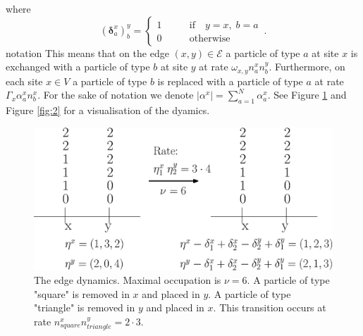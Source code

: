 \documentclass[10pt]{article}
\numberwithin{equation}{section}
\numberwithin{equation}{subsection}
\begin{document}
where 
\begin{equation}
(\bm{\delta}_{a}^{x})^{y}_{b}=\begin{cases}
1\qquad &\text{if}\quad y=x,\;b=a\\
0\qquad &\text{otherwise}
\end{cases}\,.
\end{equation}
{\color{red} notation}
This means that on the edge $(x,y)\in \mathcal{E}$  a particle of type $a$ at site $x$ is exchanged with a particle of type $b$ at site $y$ at rate $\omega_{x,y}n_{a}^{x}n_{b}^{y}$. Furthermore, on each site $x\in V$  a particle of type $b$ is replaced with a particle of type $a$ at rate $\Gamma_{x}\alpha_{a}^{x}n_{b}^{x}$. For the sake of notation we denote $|\alpha^{x}|=\sum_{a=1}^{N}\alpha_{a}^{x}$. 
See Figure \ref{fig:1} and  Figure \ref{fig:2} for a visualisation of the dyamics. 
\begin{figure}
    \centering
    \includegraphics[scale=0.45]{BulkStirring.eps}
    \caption{The edge dynamics. Maximal occupation is $\nu=6$. A particle of type "square" is removed in $x$ and placed in $y$. A particle of type "triangle" is removed in $y$ and placed in $x$. This transition occurs at rate $n_{square}^{x}n_{triangle}^{y}=2\cdot 3$.}
    \label{fig:1}
\end{figure}
\end{document}
